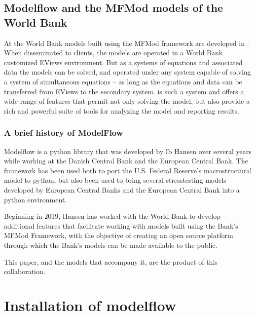 \documentclass[letterpaper,10pt,english]{jupyterBook}
\begin{document}
\chapter{Modelflow and the MFMod models of the World Bank}
\label{\detokenize{content/02_MacrostructuralModels/MFModAndModelFlow:modelflow-and-the-mfmod-models-of-the-world-bank}}\label{\detokenize{content/02_MacrostructuralModels/MFModAndModelFlow::doc}}
\sphinxAtStartPar
At the World Bank models built using the MFMod framework are developed in . When disseminated to clients, the models are operated in a World Bank customized EViews environment. But as a systems of equations and associated data the models can be solved, and operated under any system capable of solving a system of simultaneous equations – as long as the equations and data can be transferred from EViews to the secondary system.  is such a system and offers a wide range of features that permit not only solving the model, but also provide a rich and powerful suite of tools for analyzing the model and reporting results.


\section{A brief history of ModelFlow}
\label{\detokenize{content/02_MacrostructuralModels/MFModAndModelFlow:a-brief-history-of-modelflow}}
\sphinxAtStartPar
Modelflow is a python library that was developed by Ib Hansen over several years while working at the Danish Central Bank and the European Central Bank. The framework has been used both to port the U.S. Federal Reserve’s macro\sphinxhyphen{}structural  model to python, but also been used to bring several stress\sphinxhyphen{}testing models developed by European Central Banks and the European Central Bank into a python environment.

\sphinxAtStartPar
Beginning in 2019, Hansen has worked with the World Bank to develop additional features that facilitate working with models built using the Bank’s MFMod Framework, with the objective of creating an open source platform through which the Bank’s models can be made available to the public.

\sphinxAtStartPar
This paper, and the models that accompany it, are the product of this collaboration.

\sphinxstepscope


\part{Installation of modelflow}
\end{document}

